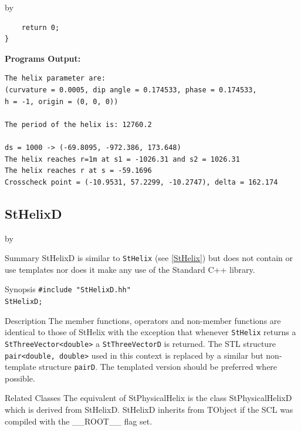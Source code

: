 \documentclass[twoside]{article}
\newcommand{\name}[1]{\textsf{#1}}%
\newcommand{\entrylabel}[1]{\mbox{\textbf{{#1}}}\hfil}%
\newenvironment{entry}
{\begin{list}{}%
    {\renewcommand{\makelabel}{\entrylabel}%
     \setlength{\labelwidth}{90pt}%
     \setlength{\leftmargin}{\labelwidth}
     \advance\leftmargin by \labelsep%
      }%
    }%
  {\end{list}}
\newcommand{\Entrylabel}[1]%
{\raisebox{0pt}[1ex][0pt]{\makebox[\labelwidth][l]%
    {\parbox[t]{\labelwidth}{\hspace{0pt}\textbf{{#1}}}}}}
\newenvironment{Entry}%
{\renewcommand{\entrylabel}{\Entrylabel}\begin{entry}}%
  {\end{entry}}
\begin{document}
\begin{description}
\begin{Entry}
{\begin{verbatim}
    return 0;
}
\end{verbatim}
}%
{\bf Programs Output:}
{\footnotesize
\begin{verbatim}
The helix parameter are:
(curvature = 0.0005, dip angle = 0.174533, phase = 0.174533,
h = -1, origin = (0, 0, 0))

The period of the helix is: 12760.2

ds = 1000 -> (-69.8095, -972.386, 173.648)
The helix reaches r=1m at s1 = -1026.31 and s2 = 1026.31
The helix reaches r at s = -59.1696
Crosscheck point = (-10.9531, 57.2299, -10.2747), delta = 162.174

\end{verbatim}
} %
\end{Entry}

\clearpage

%
%
\subsection{StHelixD } \label{StHelixD}
\begin{Entry}
\item[Summary]
    StHelixD is similar to \texttt{StHelix}
    (see \ref{StHelix}) but does not contain or use templates nor
    does it make any use of the Standard C++ library. 
    
\item[Synopsis]
    \verb+#include "StHelixD.hh"+ \\
    \verb+StHelixD;+
    
    
\item[Description]       
    The member functions, operators and non-member functions are identical
    to those of StHelix with the exception that whenever \texttt{StHelix} returns a
    \verb+StThreeVector<double>+ a \texttt{StThreeVectorD} is returned.
    The STL structure \verb+pair<double, double>+ used in this context is replaced
    by a similar but non-template structure \texttt{pairD}. 
    The templated version should be preferred where possible.

\item[Related Classes]
    The equivalent of StPhysicalHelix is the class StPhysicalHelixD which is
    derived from StHelixD. StHelixD inherits from TObject 
    if the SCL was compiled with the \name{\_\_ROOT\_\_} flag set.


\end{Entry}
\end{description}
\end{document}
